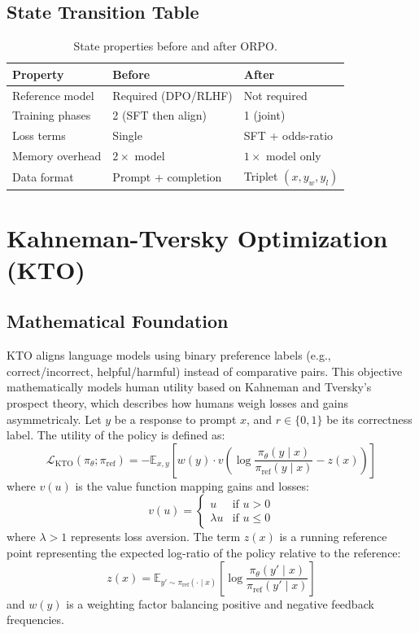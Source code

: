 \documentclass{article}
\begin{document}
\subsection{State Transition Table}
\begin{table}[h]\centering
\begin{tabular}{lll}\toprule
\textbf{Property} & \textbf{Before} & \textbf{After}\\\midrule
Reference model & Required (DPO/RLHF) & Not required\\
Training phases & 2 (SFT then align) & 1 (joint)\\
Loss terms & Single & SFT + odds-ratio\\
Memory overhead & $2\times$ model & $1\times$ model only\\
Data format & Prompt + completion & Triplet $(x, y_w, y_l)$\\\bottomrule
\end{tabular}
\caption{State properties before and after ORPO.}
\end{table}

\newpage
\section{Kahneman-Tversky Optimization (KTO)}

\subsection{Mathematical Foundation}
KTO aligns language models using binary preference labels (e.g., correct/incorrect, helpful/harmful) instead of comparative pairs. This objective mathematically models human utility based on Kahneman and Tversky's prospect theory, which describes how humans weigh losses and gains asymmetricaly.
Let $y$ be a response to prompt $x$, and $r \in \{0, 1\}$ be its correctness label. The utility of the policy is defined as:
\begin{equation}
  \mathcal{L}_{\text{KTO}}(\pi_\theta; \pi_{\text{ref}}) = -\mathbb{E}_{x, y} \left[ w(y) \cdot v\left( \log \frac{\pi_\theta(y \mid x)}{\pi_{\text{ref}}(y \mid x)} - z(x) \right) \right]
\end{equation}
where $v(u)$ is the value function mapping gains and losses:
\begin{equation}
  v(u) = \begin{cases} u & \text{if } u > 0 \\ \lambda u & \text{if } u \le 0 \end{cases}
\end{equation}
where $\lambda > 1$ represents loss aversion. The term $z(x)$ is a running reference point representing the expected log-ratio of the policy relative to the reference:
\begin{equation}
  z(x) = \mathbb{E}_{y' \sim \pi_{\text{ref}}(\cdot \mid x)} \left[ \log \frac{\pi_\theta(y' \mid x)}{\pi_{\text{ref}}(y' \mid x)} \right]
\end{equation}
and $w(y)$ is a weighting factor balancing positive and negative feedback frequencies.
\end{document}
